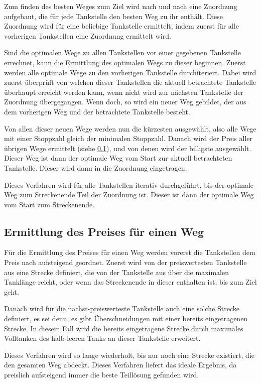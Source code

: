 \documentclass[a4paper,10pt,ngerman]{scrartcl}
\begin{document}
Zum finden des besten Weges zum Ziel wird nach und nach eine Zuordnung aufgebaut, die für jede Tankstelle den besten Weg zu ihr enthält.
Diese Zuordnung wird für eine beliebige Tankstelle ermittelt, indem zuerst für alle vorherigen Tankstellen eine Zuordnung ermittelt wird.

Sind die optimalen Wege zu allen Tankstellen vor einer gegebenen Tankstelle errechnet, kann die Ermittlung des optimalen Wegs zu dieser beginnen.
Zuerst werden alle optimale Wege zu den vorherigen Tankstelle durchiteriert.
Dabei wird zuerst überprüft von welchen dieser Tankstellen die aktuell betrachtete Tankstelle überhaupt erreicht werden kann,
wenn nicht wird zur nächsten Tankstelle der Zuordnung übergegangen.
Wenn doch, so wird ein neuer Weg gebildet, der aus dem vorherigen Weg und der betrachtete Tankstelle besteht.

Von allen dieser neuen Wege werden nun die kürzesten ausgewählt, also alle Wege mit einer Stoppzahl gleich der minimalen Stoppzahl.
Danach wird der Preis aller übrigen Wege ermittelt (siehe \cref{alg:price}), und von denen wird der billigste ausgewählt.
Dieser Weg ist dann der optimale Weg vom Start zur aktuell betrachteten Tankstelle.
Dieser wird dann in die Zuordnung eingetragen.

Dieses Verfahren wird für alle Tankstellen iterativ durchgeführt, bis der optimale Weg zum Streckenende Teil der Zuordnung ist.
Dieser ist dann der optimale Weg vom Start zum Streckenende.

\subsection{Ermittlung des Preises für einen Weg} \label{alg:price}

Für die Ermittlung des Preises für einen Weg werden vorerst die Tankstellen dem Preis nach aufsteigend geordnet.
Zuerst wird von der preiswertesten Tankstelle aus eine Strecke definiert, die von der Tankstelle aus über die maximalen Tanklänge reicht, oder wenn das Streckenende in dieser enthalten ist, bis zum Ziel geht.

Danach wird für die nächst-preiswerteste Tankstelle auch eine solche Strecke definiert, es sei denn, es gibt Überschneidungen mit einer bereits eingetragenen Strecke.
In diesem Fall wird die bereits eingetragene Strecke durch maximales Volltanken des halb-leeren Tanks an dieser Tankstelle erweitert.

Dieses Verfahren wird so lange wiederholt, bis nur noch eine Strecke existiert, die den gesamten Weg abdeckt.
Dieses Verfahren liefert das ideale Ergebnis, da preislich aufsteigend immer die beste Teillösung gefunden wird.
\end{document}

